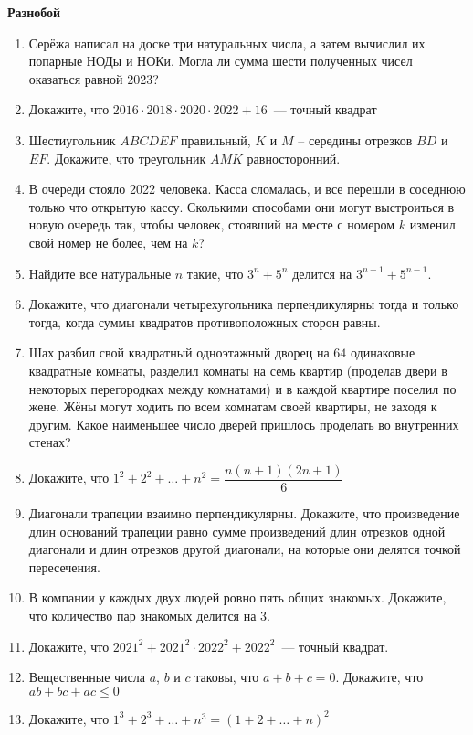 \documentclass{article}
\begin{document}
\large
	
\begin{center}
	\textbf{Разнобой}
\end{center}


\begin{enumerate}[label*=\protect\fbox{\arabic{enumi}}]
	
\item Серёжа написал на доске три натуральных числа, а затем вычислил их попарные НОДы и НОКи. Могла ли сумма шести полученных чисел оказаться равной 2023?

\item Докажите, что $2016 \cdot 2018 \cdot 2020 \cdot 2022+16$~--- точный квадрат

\item Шестиугольник $ABCDEF$ правильный, $K$ и $M$ -- середины отрезков $BD$ и $EF$. Докажите, что треугольник $AMK$ равносторонний. 

\item В очереди стояло 2022 человека. Касса сломалась, и все перешли в соседнюю только что открытую кассу. Сколькими способами они могут выстроиться в новую очередь так, чтобы человек, стоявший на месте с номером $k$ изменил свой номер не более, чем на $k$?

\item Найдите все натуральные $n$ такие, что $3^n + 5^n$ делится на $3^{n-1} + 5^{n-1}$.

\item Докажите, что диагонали четырехугольника перпендикулярны тогда и только тогда, когда суммы квадратов противоположных сторон равны. 

\item Шах разбил свой квадратный одноэтажный дворец на $64$ одинаковые квадратные комнаты, разделил комнаты на семь квартир (проделав двери в некоторых перегородках между комнатами) и в каждой квартире поселил по жене. Жёны могут ходить по всем комнатам своей квартиры, не заходя к другим. Какое наименьшее число дверей пришлось проделать во внутренних стенах?

\item Докажите, что $1^2 + 2^2 + \dots + n^2 =\dfrac{n (n+1)(2n + 1)}{6}$

\item Диагонали трапеции взаимно перпендикулярны. Докажите, что произведение длин оснований трапеции равно сумме произведений длин отрезков одной диагонали и длин отрезков другой диагонали, на которые они делятся точкой пересечения.

\item В компании у каждых двух людей ровно пять общих знакомых. Докажите, что количество пар знакомых делится на 3.

\item Докажите, что $2021^2+2021^2 \cdot 2022^2+2022^2$~--- точный квадрат.

\item Вещественные числа $a$, $b$ и $c$ таковы, что $a+b+c=0$.
Докажите, что $ab+bc+ac \le 0$

\item Докажите, что $1^3 + 2^3 + \dots + n^3 =(1 + 2 + \dots + n) ^ 2$

\end{enumerate}
\end{document}

